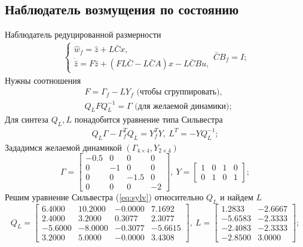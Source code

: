 \documentclass[a4paper, 12pt]{article}
\begin{document}
    \subsection{Наблюдатель возмущения по состоянию}
    Наблюдатель редуцированной размерности
    \begin{align}
    \begin{cases}
        \hat{w}_f=\hat{z}+L\bar{C}x,\\
        \dot{\hat{z}}=F\hat{z}+\left( FL\bar{C}-L\bar{C}A \right)x-L\bar{C}Bu,
    \end{cases} \bar{C}B_f=I;\label{eq:sys}
    \end{align}
    Нужны соотношения
    \begin{align}
    &F=\Gamma_f-LY_f\text{ (чтобы сгруппировать)},\label{eq:F1} \\
    &Q_LFQ_L^{-1}=\Gamma\text{ (для желаемой динамики)}; \label{eq:F2}
    \end{align}
    Для синтеза $Q_L,L$ понадобится уравнение типа Сильвестра
    \begin{align}
    Q_L\Gamma-\Gamma_f^TQ_L=Y_f^TY,\ L^T=-YQ_L^{-1};\label{eq:sylv}
    \end{align}
    Зададимся желаемой динамикой $\left( \Gamma_{4\times4},Y_{2\times4} \right)$
    $$
    \Gamma=\begin{bmatrix}
        -0.5 &0 &0 &0\\
        0 &-1 &0 &0\\
        0 &0 &-1.5 &0\\
        0 &0 &0 &-2
    \end{bmatrix},\ Y=\begin{bmatrix}
        1 &0 &1 &0\\
        0 &1 &0 &1
    \end{bmatrix};
    $$
    Решим уравнение Сильвестра (\ref{eq:sylv}) относительно $Q_L$ и найдем $L$
    $$
    Q_L=\begin{bmatrix}
    6.4000   &10.2000   &-0.0000    &7.1692\\
    2.4000    &3.2000    &0.3077    &2.3077\\
   -5.6000   &-8.0000   &-0.3077   &-5.6615\\
    3.2000    &5.0000   &-0.0000    &3.4308
    \end{bmatrix},\ L=\begin{bmatrix}
    1.2833   &-2.6667\\
   -5.6583   &-2.3333\\
   -2.4083   &-2.3333\\
   -2.8500    &3.0000
    \end{bmatrix};
    $$
\end{document}
